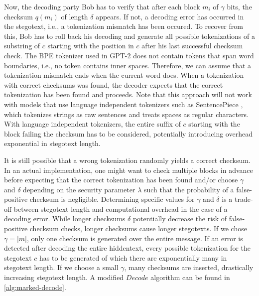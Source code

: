 Now, the decoding party Bob has to verify that after each block $m_i$ of $\gamma$ bits, the checksum $q(m_i)$ of length $\delta$ appears.
If not, a decoding error has occurred in the stegotext, i.e., a tokenization mismatch has been occured.
To recover from this, Bob has to roll back his decoding and generate all possible tokenizations of a substring of $c$ starting with the position in $c$ after his last successful checksum check.
The BPE tokenizer used in GPT-2 does not contain tokens that span word boundaries, i.e., no token contains inner spaces. Therefore, we can assume that a tokenization mismatch ends when the current word does.
When a tokenization with correct checksums was found, the decoder expects that the correct tokenization has been found and proceeds.
Note that this approach will not work with models that use language independent tokenizers such as SentencePiece \cite{SentencePiece2018}, which tokenizes strings as raw sentences and treats spaces as regular characters.
With language independent tokenizers, the entire suffix of $c$ starting with the block failing the checksum has to be considered, potentially introducing overhead exponential in stegotext length.

It is still possible that a wrong tokenization randomly yields a correct checksum.
In an actual implementation, one might want to check multiple blocks in advance before expecting that the correct tokenization has been found and/or choose $\gamma$ and $\delta$ depending on the security parameter $\lambda$ such that the probability of a false-positive checksum is negligible.
Determining specific values for $\gamma$ and $\delta$ is a trade-off between stegotext length and computational overhead in the case of a decoding error.
While longer checksums $\delta$ potentially decrease the risk of false-positive checksum checks, longer checksums cause longer stegotexts.
If we chose $\gamma = |m|$, only one checksum is generated over the entire message. 
If an error is detected after decoding the entire hiddentext, every possible tokenization for the stegotext $c$ has to be generated of which there are exponentially many in stegotext length.
If we choose a small $\gamma$, many checksums are inserted, drastically increasing stegotext length.
A modified $Decode$ algorithm can be found in \autoref{alg:marked-decode}.

